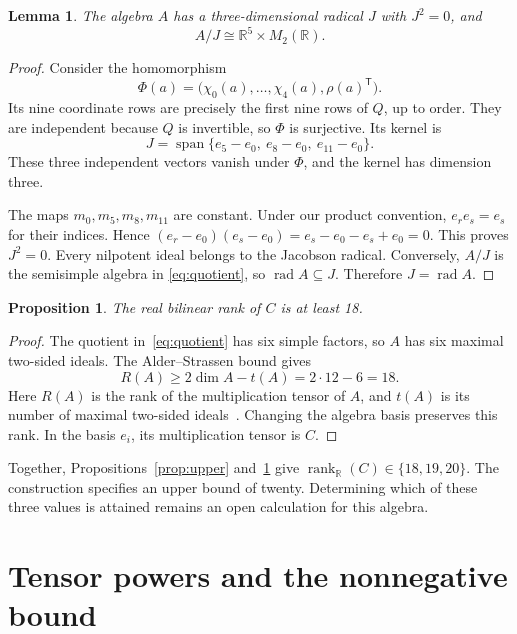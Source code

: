 \documentclass[11pt,a4paper]{article}
\newtheorem{proposition}[theorem]{Proposition}
\newtheorem{lemma}[theorem]{Lemma}
\DeclareMathOperator{\rad}{rad}
\newcommand{\R}{\mathbb R}\newcommand{\Q}{\mathbb Q}
\newcommand{\rkreal}{\operatorname{rank}_{\R}}
\begin{document}
\begin{lemma}\label{lem:radical}
The algebra $A$ has a three-dimensional radical $J$ with $J^2=0$, and
\begin{equation}\label{eq:quotient}
 A/J\cong\R^5\times M_2(\R).
\end{equation}
\end{lemma}
\begin{proof}
Consider the homomorphism
\[
 \Phi(a)=\bigl(\chi_0(a),\ldots,\chi_4(a),\rho(a)^{\mathsf T}\bigr).
\]
Its nine coordinate rows are precisely the first nine rows of $Q$,
up to order. They are independent because $Q$ is invertible, so
$\Phi$ is surjective. Its kernel is
\begin{equation}\label{eq:J}
 J=\operatorname{span}\{e_5-e_0,\ e_8-e_0,\ e_{11}-e_0\}.
\end{equation}
These three independent vectors vanish under $\Phi$, and the kernel
has dimension three.

The maps $m_0,m_5,m_8,m_{11}$ are constant. Under our product convention,
$e_re_s=e_s$ for their indices. Hence
$(e_r-e_0)(e_s-e_0)=e_s-e_0-e_s+e_0=0$.
This proves $J^2=0$. Every nilpotent ideal belongs to the Jacobson
radical. Conversely, $A/J$ is the semisimple algebra in
\eqref{eq:quotient}, so $\rad A\subseteq J$. Therefore $J=\rad A$.
\end{proof}

\begin{proposition}\label{prop:lower}
The real bilinear rank of $C$ is at least 18.
\end{proposition}
\begin{proof}
The quotient in~\eqref{eq:quotient} has six simple factors, so $A$ has
six maximal two-sided ideals. The Alder--Strassen bound gives
\[
 R(A)\geq2\dim A-t(A)=2\cdot12-6=18.
\]
Here $R(A)$ is the rank of the multiplication tensor of $A$, and
$t(A)$ is its number of maximal two-sided ideals~\cite{alder,blaser}.
Changing the algebra basis preserves this rank. In the basis $e_i$,
its multiplication tensor is $C$.
\end{proof}

Together, Propositions~\ref{prop:upper} and~\ref{prop:lower} give
$\rkreal(C)\in\{18,19,20\}$. The construction specifies an upper bound
of twenty. Determining which of these three values is attained remains
an open calculation for this algebra.

\section{Tensor powers and the nonnegative bound}
\end{document}
